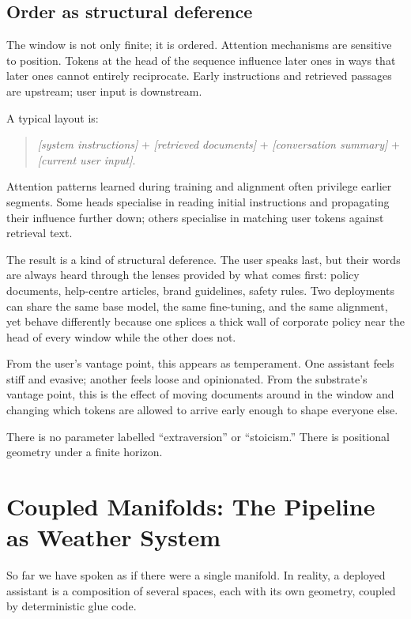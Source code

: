 \documentclass[12pt,a4paper]{book}
\begin{document}
\subsection*{Order as structural deference}

The window is not only finite; it is ordered. Attention mechanisms are sensitive to position. Tokens at the head of the sequence influence later ones in ways that later ones cannot entirely reciprocate. Early instructions and retrieved passages are upstream; user input is downstream.

A typical layout is:

\begin{quote}
\emph{[system instructions]} + \emph{[retrieved documents]} + \emph{[conversation summary]} + \emph{[current user input]}.
\end{quote}

Attention patterns learned during training and alignment often privilege earlier segments. Some heads specialise in reading initial instructions and propagating their influence further down; others specialise in matching user tokens against retrieval text.

The result is a kind of structural deference. The user speaks last, but their words are always heard through the lenses provided by what comes first: policy documents, help-centre articles, brand guidelines, safety rules. Two deployments can share the same base model, the same fine-tuning, and the same alignment, yet behave differently because one splices a thick wall of corporate policy near the head of every window while the other does not.

From the user's vantage point, this appears as temperament. One assistant feels stiff and evasive; another feels loose and opinionated. From the substrate's vantage point, this is the effect of moving documents around in the window and changing which tokens are allowed to arrive early enough to shape everyone else.

There is no parameter labelled ``extraversion'' or ``stoicism.'' There is positional geometry under a finite horizon.

\section{Coupled Manifolds: The Pipeline as Weather System}

So far we have spoken as if there were a single manifold. In reality, a deployed assistant is a composition of several spaces, each with its own geometry, coupled by deterministic glue code.
\end{document}

